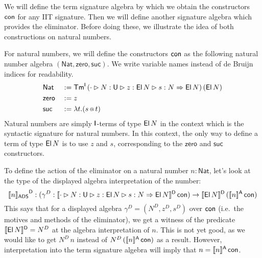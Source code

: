 \documentclass[a4paper,UKenglish,cleveref, autoref]{lipics-v2019}
\begin{document}
We will define the term signature algebra by which we obtain the constructors
$\mathsf{con}$ for any IIT signature. Then we will define another signature algebra
which provides the eliminator. Before doing these, we illustrate the idea of
both constructions on natural numbers.
\begin{example}\label{eg:nat_con}
  For natural numbers, we will define the constructors $\mathsf{con}$ as the
  following natural number algebra
  $(\mathsf{Nat},\mathsf{zero},\mathsf{suc})$. We write variable names
  instead of de Bruijn indices for readability.
  \begin{alignat*}{5}
    & \mathsf{Nat} && := \mathsf{Tm}^{\mathsf{I}}\,(\cdot\rhd N:\mathsf{U}\rhd z:\mathsf{El}\,N\rhd s:N\Rightarrow\mathsf{El}\,N)\,(\mathsf{El}\,N) \\
    & \mathsf{zero} && := z \\
    & \mathsf{suc} && := \lambda t. (s\mathop{{\scriptstyle @}} t)
  \end{alignat*}
  Natural numbers are simply $\mathsf{I}$-terms of type $\mathsf{El}\,N$ in the
  context which is the syntactic signature for natural numbers. In
  this context, the only way to define a term of type $\mathsf{El}\,N$ is to
  use $z$ and $s$, corresponding to the $\mathsf{zero}$ and
  $\mathsf{suc}$ constructors.

  To define the action of the eliminator on a natural number
  $n : \mathsf{Nat}$, let's look at the type of the displayed algebra
  interpretation of the number:
  \[
    {\llbracket n \rrbracket_{\mathsf{ADS}}}^{\mathsf{D}} : (\gamma^D : \llbracket\cdot\rhd N:\mathsf{U}\rhd z:\mathsf{El}\,N\rhd s:N\Rightarrow\mathsf{El}\,N\rrbracket^{\mathsf{D}}\,\mathsf{con}) \rightarrow \llbracket\mathsf{El}\,N\rrbracket^{\mathsf{D}}\,(\llbracket n\rrbracket^{\mathsf{A}}\,\mathsf{con})
  \]
  This says that for a displayed algebra $\gamma^D=(N^D,z^D,s^D)$ over
  $\mathsf{con}$ (i.e.\ the motives and methods of the eliminator), we get a
  witness of the predicate $\llbracket\mathsf{El}\,N\rrbracket^{\mathsf{D}} = N^D$ at the algebra
  interpretation of $n$. This is not yet good, as we would like to get
  $N^D\,n$ instead of $N^D\,(\llbracket n\rrbracket^{\mathsf{A}}\,\mathsf{con})$ as a result. However,
  interpretation into the term signature algebra will imply that
  $n = \llbracket n\rrbracket^{\mathsf{A}}\,\mathsf{con}$.
\end{example}
\end{document}
